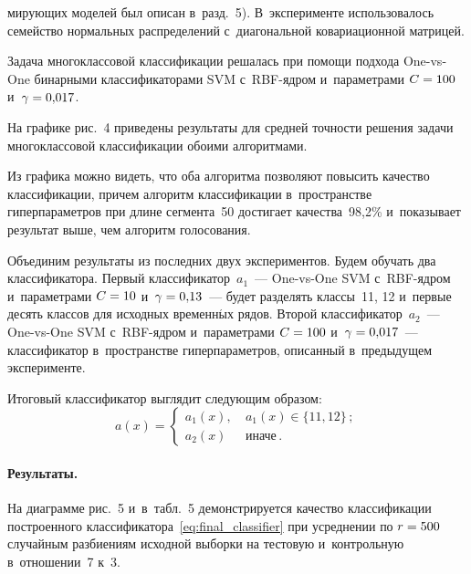 \begin{multicols}{2}

\noindent
мирующих моделей был описан 
в~разд.~5).
В~эксперименте использовалось семейство нормальных распреде\-лений с~диагональной 
ковариационной мат\-рицей.

Задача многоклассовой классификации решалась при помощи подхода One-vs-One 
бинарными классификаторами SVM с~RBF-яд\-ром и~параметрами $C\hm=100$
и~$\gamma\hm=0{,}017$.

На графике рис.~4 приведены результаты для средней 
точности решения задачи многоклассовой классификации обоими алгоритмами.

Из графика можно видеть, что оба алгоритма позволяют повысить качество 
классификации, причем алгоритм классификации в~пространстве гиперпараметров 
при длине сегмента~50 достигает качества~98,2\% и~показывает результат выше, 
чем алгоритм голосования.

Объединим результаты из последних двух экспериментов.
Будем обучать два классификатора.
Первый классификатор~$a_1$~--- One-vs-One SVM с~RBF-яд\-ром и~параметрами
$C\hm=10$ и~$\gamma\hm=0{,}13$~--- будет разделять классы~11, 12 и~первые 
десять классов для исходных временн$\acute{\mbox{ы}}$х рядов.
Второй классификатор~$a_2$~--- One-vs-One SVM с~RBF-яд\-ром 
и~параметрами $C\hm=100$ и~$\gamma\hm=0{,}017$~--- 
классификатор в~пространстве гиперпараметров, описанный в~предыду\-щем эксперименте.

Итоговый классификатор выглядит следующим образом:
\begin{equation}
\label{eq:final_classifier}
a(x)=\begin{cases}
a_1(x), &\ a_1(x)\in\{11, 12\}\,;\\
a_2(x)\ &\ \mbox{иначе}\,.
\end{cases}
\end{equation}


\paragraph*{Результаты.}
На диаграмме рис.~5 и~в~табл.~5 демонстрируется качество 
классификации построенного классификатора~\eqref{eq:final_classifier} 
при усреднении по $r\hm=500$ случайным разбиениям исходной выборки на тес\-то\-вую 
и~контрольную в~отношении~7 к~3.

\pagebreak

\end{multicols}

\begin{figure*} %
\vspace*{1pt}
\begin{center}
\mbox{%
\epsfxsize=128.626mm
}
\end{center}
\vspace*{-9pt}
\label{fig:hyperparams}
\end{figure*}


